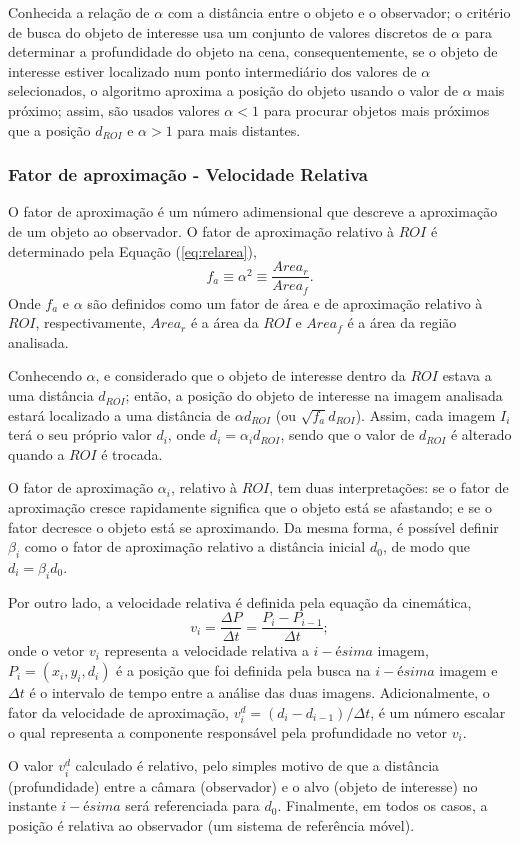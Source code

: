 Conhecida a relação de $\alpha$ com a distância entre o objeto e o observador; 
o critério de busca do objeto de interesse usa um conjunto de valores 
discretos de $\alpha$ para determinar a profundidade do objeto na cena, 
consequentemente, se o objeto de interesse estiver localizado num ponto intermediário dos valores
de $\alpha$ selecionados, o algoritmo aproxima a posição do objeto 
usando o valor de $\alpha$ mais próximo; assim, são usados valores $\alpha<1$
para procurar objetos mais próximos que a posição $d_{ROI}$ e $\alpha>1$ para mais distantes.



\subsubsection{Fator de aproximação - Velocidade Relativa}

O fator de aproximação é um número adimensional que descreve a
aproximação de um objeto ao observador.
O fator de aproximação relativo à $ROI$ é determinado pela Equação (\ref{eq:relarea}),
\begin{equation}\label{eq:relarea}
f_a \equiv \alpha^2 \equiv \frac{Area_r}{Area_f}.
\end{equation}
Onde $f_a$ e $\alpha$ são definidos como um fator de área e de aproximação relativo à $ROI$,
respectivamente, $Area_r$ é a área da $ROI$ e $Area_f$ é a área da região analisada.

Conhecendo $\alpha$, e considerado que o objeto de interesse dentro da $ROI$ estava a uma distância $d_{ROI}$; então,
a posição do objeto de interesse na imagem analisada 
estará localizado a uma distância de $\alpha d_{ROI}$ (ou $\sqrt{f_a} d_{ROI}$). Assim, cada  imagem $I_i$
terá o seu próprio  valor $d_i$, onde $d_i=\alpha_i d_{ROI}$, sendo que o valor de $d_{ROI}$
é alterado quando a $ROI$ é trocada.

O fator de aproximação $\alpha_i$, relativo à $ROI$, tem 
duas interpretações: se o fator de aproximação cresce rapidamente 
significa que o objeto está se afastando; e se o fator decresce o objeto está se aproximando.
Da mesma forma, é possível definir $\beta_i$ como o fator de aproximação relativo
a distância inicial $d_0$, de modo que $d_i=\beta_i d_0$.

Por outro lado, a velocidade relativa é definida pela equação da cinemática,
\begin{equation}
 v_i = \frac{\Delta P}{\Delta t}= \frac{P_i-P_{i-1}}{\Delta t};
\end{equation}
onde o vetor $v_i$ representa a velocidade relativa a $i-ésima$ imagem, $P_i=(x_i,y_i,d_i)$ é a posição que
foi definida pela busca na $i-ésima$ imagem e $\Delta t$ é o intervalo de tempo entre a análise das duas imagens.
Adicionalmente, o fator da velocidade de aproximação, $v^d_i=(d_i-d_{i-1})/{\Delta t}$, 
é um número escalar o qual representa a componente
responsável pela profundidade no vetor $v_i$.

O valor $v^d_i$ calculado é relativo, pelo simples motivo de que a distância (profundidade) entre a câmara 
(observador) e o alvo (objeto de interesse) no instante $i-ésima$ será referenciada para $d_0$. 
Finalmente, em todos os casos, a posição é 
relativa ao observador (um sistema de referência móvel).

